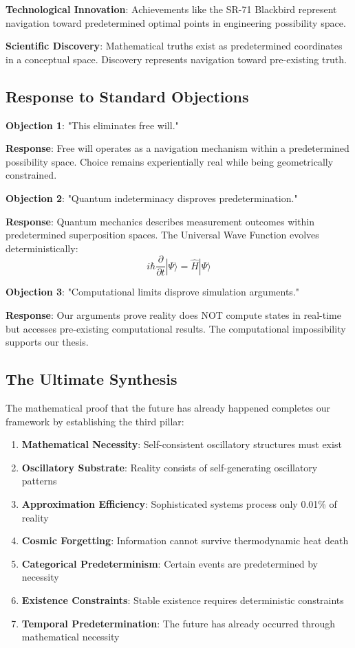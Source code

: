 \documentclass[11pt]{article}
\theoremstyle{remark}
\begin{document}
\textbf{Technological Innovation}: Achievements like the SR-71 Blackbird represent navigation toward predetermined optimal points in engineering possibility space.

\textbf{Scientific Discovery}: Mathematical truths exist as predetermined coordinates in a conceptual space. Discovery represents navigation toward pre-existing truth.

\subsection{Response to Standard Objections}

\textbf{Objection 1}: "This eliminates free will."

\textbf{Response}: Free will operates as a navigation mechanism within a predetermined possibility space. Choice remains experientially real while being geometrically constrained.

\textbf{Objection 2}: "Quantum indeterminacy disproves predetermination."

\textbf{Response}: Quantum mechanics describes measurement outcomes within predetermined superposition spaces. The Universal Wave Function evolves deterministically:
$$i\hbar \frac{\partial}{\partial t}|\Psi\rangle = \hat{H}|\Psi\rangle$$

\textbf{Objection 3}: "Computational limits disprove simulation arguments."

\textbf{Response}: Our arguments prove reality does NOT compute states in real-time but accesses pre-existing computational results. The computational impossibility supports our thesis.

\subsection{The Ultimate Synthesis}

The mathematical proof that the future has already happened completes our framework by establishing the third pillar:

\begin{enumerate}
\item \textbf{Mathematical Necessity}: Self-consistent oscillatory structures must exist
\item \textbf{Oscillatory Substrate}: Reality consists of self-generating oscillatory patterns
\item \textbf{Approximation Efficiency}: Sophisticated systems process only 0.01\% of reality
\item \textbf{Cosmic Forgetting}: Information cannot survive thermodynamic heat death
\item \textbf{Categorical Predeterminism}: Certain events are predetermined by necessity
\item \textbf{Existence Constraints}: Stable existence requires deterministic constraints
\item \textbf{Temporal Predetermination}: The future has already occurred through mathematical necessity
\end{enumerate}
\end{document}
